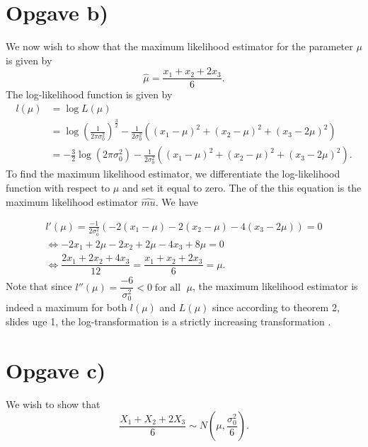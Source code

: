 \documentclass{article}
\begin{document}
\section*{Opgave b)}
We now wish to show that the maximum likelihood estimator for the parameter \( \mu \) is given by
\begin{equation}
    \hat{\mu} = \frac{x_1 + x_2 + 2x_3}{6}.
\end{equation}
The log-likelihood function is given by
\begin{equation}
    \begin{aligned}
        l(\mu) &= \log L(\mu) \\
        &= \log \left( \frac{1}{2\pi \sigma_0^2} \right)^\frac{3}{2} -\frac{1}{2\sigma_0^2} \left( (x_1 - \mu)^2 + (x_2 - \mu)^2 + (x_3 - 2\mu)^2 \right) \\
        &= -\frac{3}{2} \log(2\pi \sigma_0^2) - \frac{1}{2\sigma_0^2} \left( (x_1 - \mu)^2 + (x_2 - \mu)^2 + (x_3 - 2\mu)^2 \right).
    \end{aligned}
\end{equation}
To find the maximum likelihood estimator, we differentiate the log-likelihood function with respect to \( \mu \) and set it equal to zero. The of the this equation is the maximum likelihood estimator $\hat{mu}$. We have

\begin{equation}
    \begin{aligned}
         l'(\mu) = \frac{-1}{2\sigma_0^2} \left( -2(x_1 - \mu) - 2(x_2 - \mu) - 4(x_3 - 2\mu) \right) = 0  \\ \iff
         -2x_1 + 2\mu - 2x_2 + 2\mu - 4x_3 + 8\mu = 0\\
    \iff \dfrac{2x_1 + 2x_2 + 4x_3}{12} = \dfrac{x_1 + x_2 + 2x_3}{6} = \mu .
        \end{aligned}
\end{equation}
Note that since $l''(\mu) = \dfrac{-6}{\sigma_0^2} < 0 \; \text{for all }\; \mu $, the maximum likelihood estimator is indeed a maximum for both $l(\mu)$ and $L(\mu)$ since according to theorem 2, slides uge 1, the log-transformation is a strictly increasing transformation .

\section*{Opgave c)}

We wish to show that
\begin{equation}
    \dfrac{X_1 + X_2 + 2X_3}{6} \sim N(\mu, \dfrac{\sigma_0^2}{6}).
    \label{eq:31}
\end{equation}
\end{document}
